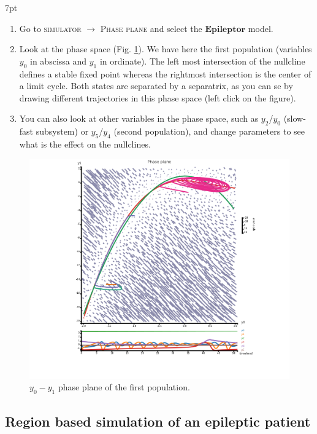 \documentclass{tufte-handout}
\newenvironment{formal}{%
  \def\FrameCommand{%
    \hspace{1pt}%
    {\color{DarkBlue}\vrule width 2pt}%
    {\color{formalshade}\vrule width 4pt}%
    \colorbox{formalshade}%
  }%
  \MakeFramed{\advance\hsize-\width\FrameRestore}%
  \noindent\hspace{-4.55pt}%
  \begin{adjustwidth}{}{7pt}%
  \vspace{2pt}\vspace{2pt}%
}
{%
  \vspace{2pt}\end{adjustwidth}\endMakeFramed%
}
\begin{document}
\begin{formal}
  \begin{enumerate}[resume]
  \item Go to \textsc{simulator} $\rightarrow$ \textsc{Phase plane} and select the $\mathbf{Epileptor}$ model.
  \item Look at the phase space (Fig. \ref{fig:phase_space}). We have here the first population (variables $y_0$ in abscissa and 
  $y_1$ in ordinate).
  The left most intersection of the nullcline defines a stable fixed point whereas the rightmost intersection 
  is the center of a limit cycle. Both states are separated by a separatrix, as you can se by drawing different trajectories
  in this phase space (left click on the figure).
  \item You can also look at other variables in the phase space, such as $y_2$/$y_0$ (slow-fast subsystem) or 
  $y_5$/$y_4$ (second population), and change parameters to see what is the effect on the nullclines.
  \end{enumerate}
\end{formal}


\begin{figure}[h]
  \includegraphics[width=\linewidth]{Handout_UI_ModellingEpilepsy_PhaseSpace}%
  \caption{$y_0-y_1$ phase plane of the first population.}%
  \label{fig:phase_space}%
\end{figure}
\subsection{Region based simulation of an epileptic patient}
\end{document}
